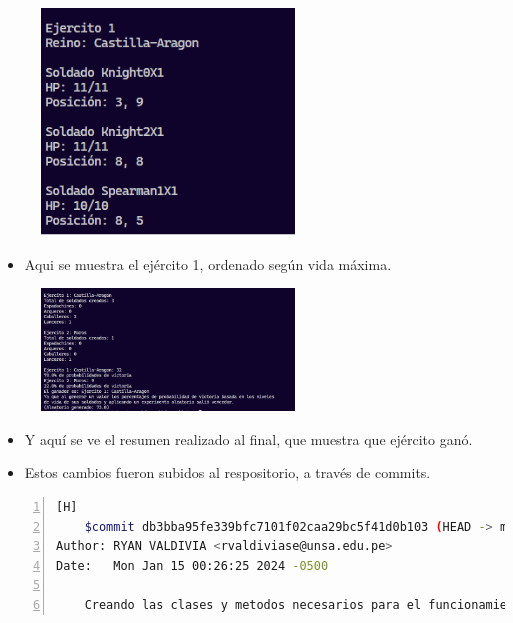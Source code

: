 \documentclass{article}
\begin{document}
	\begin{figure}[H]
		\centering
	\includegraphics[width=0.6\textwidth,keepaspectratio]{img/ordenar.png}
	\end{figure}
	\begin{itemize}	
		\item Aqui se muestra el ejército 1, ordenado según vida máxima.
	\end{itemize}
	\begin{figure}[H]
		\centering
	\includegraphics[width=0.6\textwidth,keepaspectratio]{img/resumen.png}
	\end{figure}
	\begin{itemize}	
		\item Y aquí se ve el resumen realizado al final, que muestra que ejército ganó.
		\item Estos cambios fueron subidos al respositorio, a través de commits.
	\end{itemize}
	
	\begin{lstlisting}[language=bash,caption={Commit}, numbers=left][H]
	$commit db3bba95fe339bfc7101f02caa29bc5f41d0b103 (HEAD -> main, origin/main)
Author: RYAN VALDIVIA <rvaldiviase@unsa.edu.pe>
Date:   Mon Jan 15 00:26:25 2024 -0500

    Creando las clases y metodos necesarios para el funcionamiento principal del videojuego
	\end{lstlisting}
	
\end{document}
